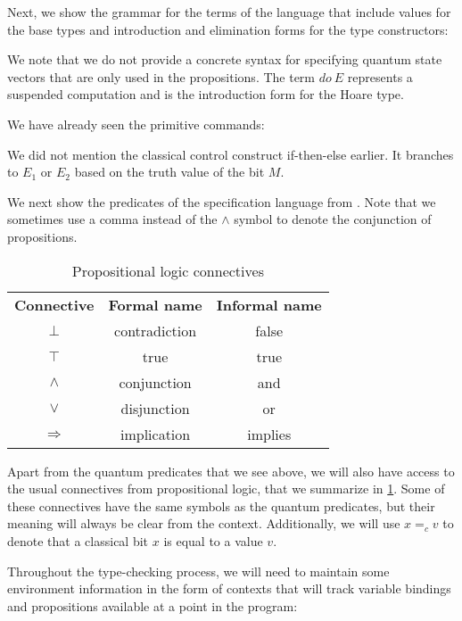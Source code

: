 \documentclass[adraft,creativecommons]{eptcs}
\theoremstyle{definition}
\theoremstyle{remark}
\begin{document}
Next, we show the grammar for the terms of the language that include values for the base types and introduction and elimination forms for the type constructors:


We note that we do not provide a concrete syntax for specifying quantum state vectors that are only used in the propositions. The term $do\ E$ represents a suspended computation and is the introduction form for the Hoare type.

We have already seen the primitive commands:


We did not mention the classical control construct if-then-else earlier. It branches to $E_1$ or $E_2$ based on the truth value of the bit $M$.

We next show the predicates of the specification language from \textcite{unruh2019}. Note that we sometimes use a comma instead of the $\wedge$ symbol to denote the conjunction of propositions.


\begin{table}
    \centering
    \begin{tabular}{ c c c }
        \textbf{Connective} & \textbf{Formal name} & \textbf{Informal name} \\
        $\bot$ & contradiction & false \\
        $\top$ & true & true\\
        $\wedge$ & conjunction & and\\
        $\vee$ & disjunction & or\\
        $\Rightarrow$ & implication & implies\\
    \end{tabular}
    \caption{Propositional logic connectives}
    \label{table:proplogic}
\end{table}

Apart from the quantum predicates that we see above, we will also have access to the usual connectives from propositional logic, that we summarize in \cref{table:proplogic}. Some of these connectives have the same symbols as the quantum predicates, but their meaning will always be clear from the context. Additionally, we will use $x =_c v$ to denote that a classical bit $x$ is equal to a value $v$.

Throughout the type-checking process, we will need to maintain some environment information in the form of contexts that will track variable bindings and propositions available at a point in the program:
\end{document}
